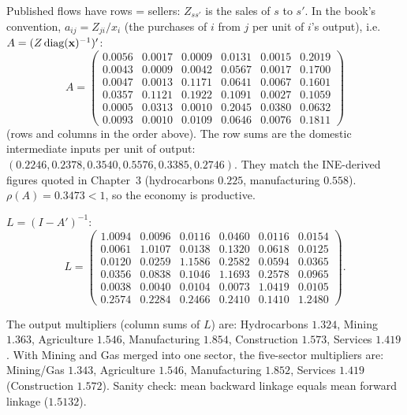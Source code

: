 \documentclass[../solutions_manual.tex]{subfiles}
\begin{document}
 Published flows have rows = sellers: $Z_{s s'}$ is the sales of $s$ to $s'$. In the book's convention, $a_{ij} = Z_{ji}/x_i$ (the purchases of $i$ from $j$ per unit of $i$'s output), i.e.\ $A = (Z\,\text{diag}(\mathbf{x})^{-1})'$:
\[
A = \begin{pmatrix}
0.0056 & 0.0017 & 0.0009 & 0.0131 & 0.0015 & 0.2019\\
0.0043 & 0.0009 & 0.0042 & 0.0567 & 0.0017 & 0.1700\\
0.0047 & 0.0013 & 0.1171 & 0.0641 & 0.0067 & 0.1601\\
0.0357 & 0.1121 & 0.1922 & 0.1091 & 0.0027 & 0.1059\\
0.0005 & 0.0313 & 0.0010 & 0.2045 & 0.0380 & 0.0632\\
0.0093 & 0.0010 & 0.0109 & 0.0646 & 0.0076 & 0.1811
\end{pmatrix}
\]
(rows and columns in the order above). The row sums are the domestic intermediate inputs per unit of output: $(0.2246, 0.2378, 0.3540, 0.5576, 0.3385, 0.2746)$. They match the INE-derived figures quoted in Chapter~3 (hydrocarbons $0.225$, manufacturing $0.558$). $\rho(A) = 0.3473 < 1$, so the economy is productive.

 $L = (I - A')^{-1}$:
\[
L = \begin{pmatrix}
1.0094 & 0.0096 & 0.0116 & 0.0460 & 0.0116 & 0.0154\\
0.0061 & 1.0107 & 0.0138 & 0.1320 & 0.0618 & 0.0125\\
0.0120 & 0.0259 & 1.1586 & 0.2582 & 0.0594 & 0.0365\\
0.0356 & 0.0838 & 0.1046 & 1.1693 & 0.2578 & 0.0965\\
0.0038 & 0.0040 & 0.0104 & 0.0073 & 1.0419 & 0.0105\\
0.2574 & 0.2284 & 0.2466 & 0.2410 & 0.1410 & 1.2480
\end{pmatrix}.
\]

 The output multipliers (column sums of $L$) are: Hydrocarbons $1.324$, Mining $1.363$, Agriculture $1.546$, Manufacturing $1.854$, Construction $1.573$, Services $1.419$. With Mining and Gas merged into one sector, the five-sector multipliers are: Mining/Gas $1.343$, Agriculture $1.546$, Manufacturing $1.852$, Services $1.419$ (Construction $1.572$). Sanity check: mean backward linkage equals mean forward linkage ($1.5132$).
\end{document}
